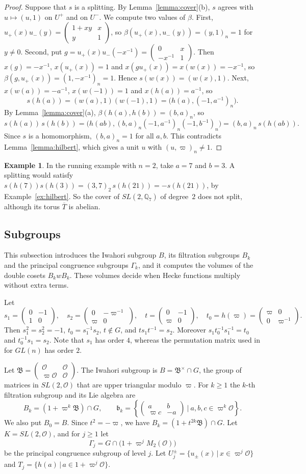 \documentclass[12pt,letterpaper]{amsart}
\numberwithin{equation}{section}
\theoremstyle{definition}
\newtheorem{example}[theorem]{Example}
\theoremstyle{remark}
\newcommand{\cO}{\mathcal{O}}
\newcommand{\fB}{\mathfrak{B}}
\newcommand{\fb}{\mathfrak{b}}
\newcommand{\mat}[4]{\begin{pmatrix} #1 & #2\\ #3 & #4\end{pmatrix}}
\begin{document}
\begin{proof}
Suppose that $s$ is a splitting. By Lemma~\ref{lemma:cover}(b), $s$
agrees with $u\mapsto(u,1)$ on $U^+$ and on $U^-$. We compute two
values of $\beta$. First, $u_+(x)u_-(y)=\mat{1+xy}xy1$, so
$\beta(u_+(x),u_-(y))=(y,1)_n=1$ for $y\neq 0$. Second, put
$g=u_+(x)u_-(-x^{-1})=\mat 0x{-x^{-1}}1$. Then $x(g)=-x^{-1}$,
$x(u_+(x))=1$ and $x(gu_+(x))=x(w(x))=-x^{-1}$, so
$\beta(g,u_+(x))=(1,-x^{-1})_n=1$. Hence $s(w(x))=(w(x),1)$. Next,
$x(w(a))=-a^{-1}$, $x(w(-1))=1$ and $x(h(a))=a^{-1}$, so
\[
s(h(a))=(w(a),1)(w(-1),1)=\bigl(h(a),(-1,a^{-1})_n\bigr).
\]
By Lemma~\ref{lemma:cover}(a), $\beta(h(a),h(b))=(b,a)_n$, so
\[
s(h(a))\,s(h(b))=\bigl(h(ab),(b,a)_n(-1,a^{-1})_n(-1,b^{-1})_n\bigr)
=(b,a)_n\,s(h(ab)).
\]
Since $s$ is a homomorphism, $(b,a)_n=1$ for all $a,b$. This
contradicts Lemma~\ref{lemma:hilbert}, which gives a unit $u$ with
$(u,\varpi)_n\neq 1$.
\end{proof}

\begin{example}
\label{ex:nonsplit}
In the running example with $n=2$, take $a=7$ and $b=3$. A splitting
would satisfy $s(h(7))s(h(3))=(3,7)_2\,s(h(21))=-s(h(21))$, by
Example~\ref{ex:hilbert}. So the cover of $SL(2,\mathbb{Q}_7)$ of
degree~$2$ does not split, although its torus $\overline{T}$ is
abelian.
\end{example}

\subsection{Subgroups}
\label{subsec:subgroups}
This subsection introduces the Iwahori subgroup $B$, its filtration
subgroups $B_k$ and the principal congruence subgroups $\Gamma_k$, and
it computes the volumes of the double cosets $B_kwB_k$. These volumes
decide when Hecke functions multiply without extra terms.

Let
\[
s_1=\mat 0{-1}10,\quad
s_2=\mat 0{-\varpi^{-1}}{\varpi}0,\quad
t=\mat 0{-1}{\varpi}0,\quad
t_0=h(\varpi)=\mat{\varpi}00{\varpi^{-1}}.
\]
Then $s_1^2=s_2^2=-1$, $t_0=s_1^{-1}s_2$, $t\notin G$, and
$ts_1t^{-1}=s_2$. Moreover $s_1t_0^{-1}s_1^{-1}=t_0$ and
$t_0^{-1}s_1=s_2$. Note that $s_1$ has order $4$, whereas the permutation
matrix used in \cite{HM85} for $GL(n)$ has order $2$.

Let $\fB=\mat{\cO}{\cO}{\varpi\cO}{\cO}$. The Iwahori subgroup is
$B=\fB^\times\cap G$, the group of matrices in $SL(2,\cO)$ that are
upper triangular modulo $\varpi$. For $k\geq 1$ the $k$-th filtration
subgroup and its Lie algebra are
\[
B_k=(1+\varpi^k\fB)\cap G,\qquad
\fb_k=\left\{\mat ab{\varpi c}{-a}\ \Big|\ a,b,c\in\varpi^k\cO\right\}.
\]
We also put $B_0=B$. Since $t^2=-\varpi$, we have
$B_k=(1+t^{2k}\fB)\cap G$. Let $K=SL(2,\cO)$, and for $j\geq 1$ let
\[
\Gamma_j=G\cap\bigl(1+\varpi^jM_2(\cO)\bigr)
\]
be the principal congruence subgroup of level $j$. Let
$U^\pm_j=\{u_\pm(x)\,|\,x\in\varpi^j\cO\}$ and
$T_j=\{h(a)\,|\,a\in 1+\varpi^j\cO\}$.
\end{document}
